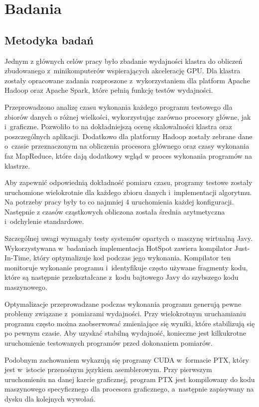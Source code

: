 \chapter{Badania} \label{ch:badania}

\section{Metodyka badań}

Jednym z głównych celów pracy było zbadanie wydajności klastra do obliczeń 
zbudowanego z~minikomputerów wspierających akcelerację GPU. Dla klastra zostały opracowane zadania
rozproszone z~wykorzystaniem dla platform Apache Hadoop oraz Apache Spark, które pełnią funkcję
testów wydajności.

Przeprowadzono analizę czasu wykonania każdego programu testowego dla zbiorów danych o różnej
wielkości, wykorzystując zarówno procesory główne, jak i~graficzne. Pozwoliło to na dokładniejszą
ocenę skalowalności klastra oraz poszczególnych aplikacji. Dodatkowo dla platformy Hadoop zostały
zebrane dane o~czasie przeznaczonym na obliczenia procesora głównego oraz czasy wykonania faz
MapReduce, które dają dodatkowy wgląd w proces wykonania programów na klastrze.

Aby zapewnić odpowiednią dokładność pomiaru czasu, programy testowe zostały uruchomione wielokrotnie
dla każdego zbioru danych i~implementacji algorytmu. Na potrzeby pracy były to co najmniej 4
uruchomienia każdej konfiguracji. Następnie z czasów cząstkowych obliczona została średnia
arytmetyczna i~odchylenie standardowe.

Szczególnej uwagi wymagały testy systemów opartych o maszynę wirtualną Javy. Wykorzystywana
w~badaniach implementacja HotSpot zawiera kompilator Just-In-Time, który optymalizuje kod podczas
jego wykonania. Kompilator ten monitoruje wykonanie programu i~identyfikuje często używane fragmenty
kodu, które są następnie przekształcane z~kodu bajtowego Javy do szybszego kodu maszynowego.

Optymalizacje przeprowadzane podczas wykonania programu generują pewne problemy związane
z~pomiarami wydajności. Przy wielokrotnym uruchamianiu programu często można zaobserwować zmieniające
się wyniki, które stabilizują się po pewnym czasie. Aby uzyskać stabilną wydajność, konieczne jest
kilkukrotne uruchomienie testowanych programów przed dokonaniem pomiarów.
\newpage

Podobnym zachowaniem wykazują się programy CUDA w~formacie PTX, który jest w~istocie przenośnym
językiem asemblerowym. Przy pierwszym uruchomieniu na danej karcie graficznej, program PTX jest
kompilowany do kodu maszynowego specyficznego dla procesora graficznego, a~następnie zapisywany
na dysku dla kolejnych wywołań.


